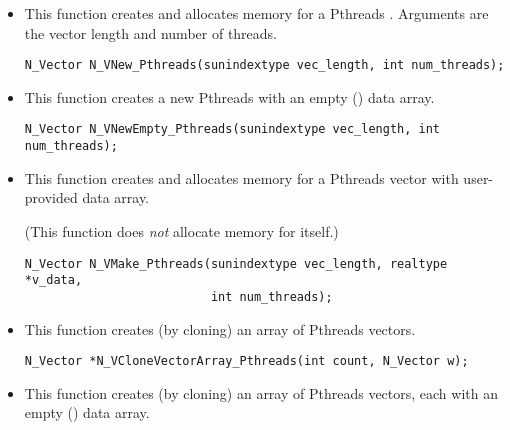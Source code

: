 \begin{itemize}


\item {}

  This function creates and allocates memory for a Pthreads .
  Arguments are the vector length and number of threads.

  

  \verb|N_Vector N_VNew_Pthreads(sunindextype vec_length, int num_threads);|


\item {}

  This function creates a new Pthreads  with an empty () data array.

  

  \verb|N_Vector N_VNewEmpty_Pthreads(sunindextype vec_length, int num_threads);|


\item {}

 This function creates and allocates memory for a Pthreads vector
 with user-provided data array.

 (This function does {\em not} allocate memory for  itself.)

\begin{verbatim}
N_Vector N_VMake_Pthreads(sunindextype vec_length, realtype *v_data,
                          int num_threads);
\end{verbatim}


\item {}

 This function creates (by cloning) an array of  Pthreads vectors.

 

 \verb|N_Vector *N_VCloneVectorArray_Pthreads(int count, N_Vector w);|


\item {}

 This function creates (by cloning) an array of  Pthreads vectors, each with an
 empty () data array.


\end{itemize}
